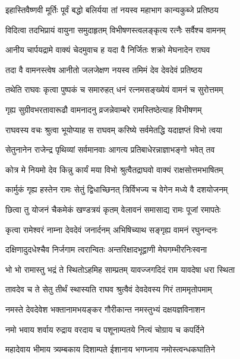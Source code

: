 \twolineshloka
{इहास्तिवैष्णवी मूर्तिः पूर्वं बद्धो बलिर्यया}
{तां नयस्व महाभाग कान्यकुब्जे प्रतिष्ठय}%

\twolineshloka
{विदित्वा तदभिप्रायं वायुना समुदाहृतम्}
{विभीषणस्त्वलङ्कृत्य रत्नैः सर्वैश्च वामनम्}%

\twolineshloka
{आनीय चार्पयद्रामे वाक्यं चेदमुवाच ह}
{यदा वै निर्जितः शक्रो मेघनादेन राघव}%

\twolineshloka
{तदा वै वामनस्त्वेष आनीतो जलजेक्षण}
{नयस्व तमिमं देव देवदेवं प्रतिष्ठय}%

\twolineshloka
{तथेति राघवः कृत्वा पुष्पकं च समारुहत्}
{धनं रत्नमसङ्ख्येयं वामनं च सुरोत्तमम्}%

\twolineshloka
{गृह्य सुग्रीवभरतावारूढौ वामनादनु}
{व्रजन्नेवाम्बरे रामस्तिष्ठेत्याह विभीषणम्}%

\twolineshloka
{राघवस्य वचः श्रुत्वा भूयोप्याह स राघवम्}
{करिष्ये सर्वमेतद्धि यदाज्ञप्तं विभो त्वया}%

\twolineshloka
{सेतुनानेन राजेन्द्र पृथिव्यां सर्वमानवाः}
{आगत्य प्रतिबाधेरन्नाज्ञाभङ्गो भवेत् तव}%

\twolineshloka
{कोत्र मे नियमो देव किन्नु कार्यं मया विभो}
{श्रुत्वैतद्राघवो वाक्यं राक्षसोत्तमभाषितम्}%

\twolineshloka
{कार्मुकं गृह्य हस्तेन रामः सेतुं द्विधाच्छिनत्}
{त्रिर्विभज्य च वेगेन मध्ये वै दशयोजनम्}%

\twolineshloka
{छित्वा तु योजनं चैकमेकं खण्डत्रयं कृतम्}
{वेलावनं समासाद्य रामः पूजां रमापतेः}%

\twolineshloka
{कृत्वा रामेश्वरं नाम्ना देवदेवं जनार्दनम्}
{अभिषिच्याथ सङ्गृह्य वामनं रघुनन्दनः}%

\twolineshloka
{दक्षिणादुदधेश्चैव निर्जगाम त्वरान्वितः}
{अन्तरिक्षादभूद्वाणी मेघगम्भीरनिःस्वना}%


\twolineshloka
{भो भो रामास्तु भद्रं ते स्थितोऽहमिह साम्प्रतम्}
{यावज्जगदिदं राम यावदेषा धरा स्थिता}%

\twolineshloka
{तावदेव च ते सेतु तीर्थं स्थास्यति राघव}
{श्रुत्वैवं देवदेवस्य गिरं ताममृतोपमाम्}%


\twolineshloka
{नमस्ते देवदेवेश भक्तानामभयङ्कर}
{गौरीकान्त नमस्तुभ्यं दक्षयज्ञविनाशन}%

\twolineshloka
{नमो भवाय शर्वाय रुद्राय वरदाय च}
{पशूनाम्पतये नित्यं चोग्राय च कपर्दिने}%

\twolineshloka
{महादेवाय भीमाय त्र्यम्बकाय दिशाम्पते}
{ईशानाय भगघ्नाय नमोस्त्वन्धकघातिने}%

